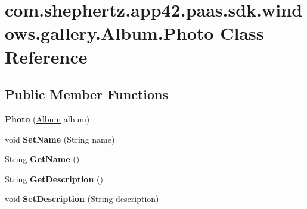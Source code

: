 \hypertarget{classcom_1_1shephertz_1_1app42_1_1paas_1_1sdk_1_1windows_1_1gallery_1_1_album_1_1_photo}{\section{com.\+shephertz.\+app42.\+paas.\+sdk.\+windows.\+gallery.\+Album.\+Photo Class Reference}
\label{classcom_1_1shephertz_1_1app42_1_1paas_1_1sdk_1_1windows_1_1gallery_1_1_album_1_1_photo}
}
\subsection*{Public Member Functions}
\begin{DoxyCompactItemize}
\item 
\hypertarget{classcom_1_1shephertz_1_1app42_1_1paas_1_1sdk_1_1windows_1_1gallery_1_1_album_1_1_photo_adc6183f21a29ac746eec215493540744}{{\bfseries Photo} (\hyperlink{classcom_1_1shephertz_1_1app42_1_1paas_1_1sdk_1_1windows_1_1gallery_1_1_album}{Album} album)}\label{classcom_1_1shephertz_1_1app42_1_1paas_1_1sdk_1_1windows_1_1gallery_1_1_album_1_1_photo_adc6183f21a29ac746eec215493540744}

\item 
\hypertarget{classcom_1_1shephertz_1_1app42_1_1paas_1_1sdk_1_1windows_1_1gallery_1_1_album_1_1_photo_ac41279e965693ce76cc9b99447d233a6}{void {\bfseries Set\+Name} (String name)}\label{classcom_1_1shephertz_1_1app42_1_1paas_1_1sdk_1_1windows_1_1gallery_1_1_album_1_1_photo_ac41279e965693ce76cc9b99447d233a6}

\item 
\hypertarget{classcom_1_1shephertz_1_1app42_1_1paas_1_1sdk_1_1windows_1_1gallery_1_1_album_1_1_photo_a363dd28606d7753f50fbc9a83bd47339}{String {\bfseries Get\+Name} ()}\label{classcom_1_1shephertz_1_1app42_1_1paas_1_1sdk_1_1windows_1_1gallery_1_1_album_1_1_photo_a363dd28606d7753f50fbc9a83bd47339}

\item 
\hypertarget{classcom_1_1shephertz_1_1app42_1_1paas_1_1sdk_1_1windows_1_1gallery_1_1_album_1_1_photo_afc41e79ae35c4d141d6c59a904d00ba6}{String {\bfseries Get\+Description} ()}\label{classcom_1_1shephertz_1_1app42_1_1paas_1_1sdk_1_1windows_1_1gallery_1_1_album_1_1_photo_afc41e79ae35c4d141d6c59a904d00ba6}

\item 
\hypertarget{classcom_1_1shephertz_1_1app42_1_1paas_1_1sdk_1_1windows_1_1gallery_1_1_album_1_1_photo_ac4c989ce232093baea9b30ab06772253}{void {\bfseries Set\+Description} (String description)}\label{classcom_1_1shephertz_1_1app42_1_1paas_1_1sdk_1_1windows_1_1gallery_1_1_album_1_1_photo_ac4c989ce232093baea9b30ab06772253}


\end{DoxyCompactItemize}
